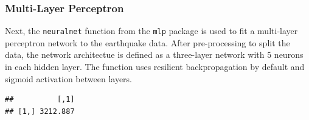 
\subsubsection{Multi-Layer Perceptron}

Next, the \texttt{neuralnet} function from the \texttt{mlp} package is used to fit a multi-layer perceptron network to the earthquake data.  After pre-processing to split the data, the network architectue is defined as a three-layer network with 5 neurons in each hidden layer.  The function uses resilient backpropagation by default and sigmoid activation between layers.

\begin{Shaded}
\begin{Highlighting}[]
\NormalTok{(}\NormalTok{)}

\OtherTok{\textless{}{-}}\NormalTok{ earthquakes\_log[}\NormalTok{(}\NormalTok{(earthquakes\_log)), ]}

\OtherTok{\textless{}{-}}  \SpecialCharTok{*} 
\OtherTok{\textless{}{-}}\NormalTok{ df[}\SpecialCharTok{:}\NormalTok{train\_test\_split,]}
\OtherTok{\textless{}{-}}\NormalTok{ df[(train\_test\_split}\SpecialCharTok{+}\NormalTok{)}\SpecialCharTok{:} \NormalTok{(df),]}

\OtherTok{\textless{}{-}} \SpecialCharTok{\textasciitilde{}}
                  \NormalTok{,}
                  \NormalTok{(}\NormalTok{,}\NormalTok{))}

\OtherTok{\textless{}{-}}  \NormalTok{(} \NormalTok{))}
\SpecialCharTok{/}\SpecialCharTok{\^{}}
\end{Highlighting}
\end{Shaded}

\begin{verbatim}
##          [,1]
## [1,] 3212.887
\end{verbatim}

